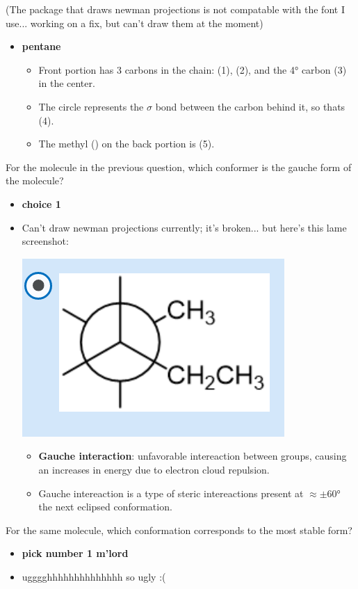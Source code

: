 \documentclass[12pt,a4paper]{article}
\begin{document}
\begin{enumerate}
{    (The package that draws newman projections is not compatable with the font I use... working on a fix, but can't draw them at the moment)
    }
        \begin{itemize}
            \item {\color{o-Sun}\textbf{pentane}}
            \begin{itemize}
                \item Front portion has 3 carbons in the chain:  (1),  (2), and the \ang{4} carbon (3) in the center.
                \item The circle represents the $\sigma$ bond between the carbon behind it, so thats (4).
                \item The methyl () on the back portion is (5).
            \end{itemize}
        \end{itemize}
        \newpage
    {\color{G-Moon}\item For the molecule in the previous question, which conformer is the gauche form of the molecule?}
        \begin{itemize}
            \item {\color{o-Sun}\textbf{choice 1}}
            \item Can't draw newman projections currently; it's broken... but here's this lame screenshot:
            
            \includegraphics[scale=0.3]{images/newman1.png}
            \begin{itemize}
                \item \textbf{Gauche interaction}: unfavorable intereaction between groups, causing an increases in energy due to electron cloud repulsion.
                \item Gauche intereaction is a type of steric intereactions present at \(\approx\pm\ang{60}\) the next eclipsed conformation. 
                \end{itemize}
        \end{itemize}
    {\color{G-Moon}\item For the same molecule, which conformation corresponds to the most stable form?}
        \begin{itemize}
            \item {\color{o-Sun}\textbf{pick number 1 m'lord}}
            \item ugggghhhhhhhhhhhhhh so ugly :(
            

\end{itemize}
\end{enumerate}
\end{document}
